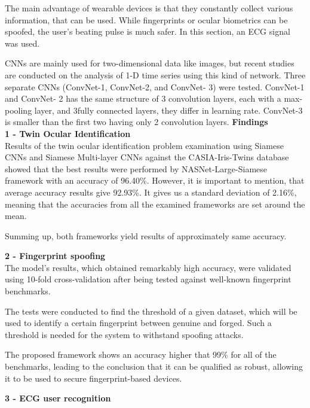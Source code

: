 \documentclass[a4paper, 12pt]{article}
\begin{document}
The main advantage of wearable devices is that they constantly collect various information, that can be used. While fingerprints or ocular biometrics can be spoofed, the user's beating pulse is much safer. In this section, an ECG signal was used.

CNNs are mainly used for two-dimensional data like images, but recent studies are conducted on the analysis of 1-D time series using this kind of network. Three separate CNNs (ConvNet-1, ConvNet-2, and ConvNet- 3) were tested. ConvNet-1 and ConvNet- 2 has the same structure of 3 convolution layers, each with a max-pooling layer, and 3fully connected layers, they differ in learning rate. ConvNet-3 is smaller than the first two having only 2 convolution layers.
\bigbreak
\Large \textbf{Findings}\\

\large \textbf{1 - Twin Ocular Identification}\\

Results of the twin ocular identification problem examination using Siamese CNNs and Siamese Multi-layer CNNs against the CASIA-Iris-Twins database showed that the best results were performed by NASNet-Large-Siamese framework with an accuracy of 96.40\%. However, it is important to mention, that average accuracy results give 92.93\%. It gives us a standard deviation of 2.16\%, meaning that the accuracies from all the examined frameworks are set around the mean. 

Summing up, both frameworks yield results of approximately same accuracy.

\clearpage

\large \textbf{2 - Fingerprint spoofing}\\

The model's results, which obtained remarkably high accuracy, were validated using 10-fold cross-validation after being tested against well-known fingerprint benchmarks.

The tests were conducted to find the threshold of a given dataset, which will be used to identify a certain fingerprint between genuine and forged. Such a threshold is needed for the system to withstand spoofing attacks.

The proposed framework shows an accuracy higher that 99\% for all of the benchmarks, leading to the conclusion that it can be qualified as robust, allowing it to be used to secure fingerprint-based devices.

\bigbreak
\large \textbf{3 - ECG user recognition}\\
\end{document}
